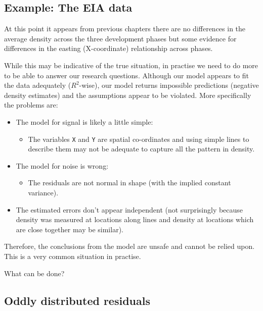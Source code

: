 \documentclass[
  oneside]{krantz}
\providecommand{\tightlist}{%
  \setlength{\itemsep}{0pt}\setlength{\parskip}{0pt}}
\begin{document}
\hypertarget{example-the-eia-data}{%
\subsection{Example: The EIA data}\label{example-the-eia-data}}

At this point it appears from previous chapters there are no differences in the average density across the three development phases but some evidence for differences in the easting (X-coordinate) relationship across phases.

While this may be indicative of the true situation, in practise we need to do more to be able to answer our research questions. Although our model appears to fit the data adequately (\(R^2\)-wise), our model returns impossible predictions (negative density estimates) and the assumptions appear to be violated. More specifically the problems are:

\begin{itemize}
\tightlist
\item
  The model for signal is likely a little simple:

  \begin{itemize}
  \tightlist
  \item
    The variables \texttt{X} and \texttt{Y} are spatial co-ordinates and using simple lines to describe them may not be adequate to capture all the pattern in density.
  \end{itemize}
\item
  The model for noise is wrong:

  \begin{itemize}
  \tightlist
  \item
    The residuals are not normal in shape (with the implied constant variance).
  \end{itemize}
\item
  The estimated errors don't appear independent (not surprisingly because density was measured at locations along lines and density at locations which are close together may be similar).
\end{itemize}

Therefore, the conclusions from the model are unsafe and cannot be relied upon. This is a very common situation in practise.

What can be done?

\hypertarget{oddly-distributed-residuals}{%
\subsection{Oddly distributed residuals}\label{oddly-distributed-residuals}}
\end{document}
